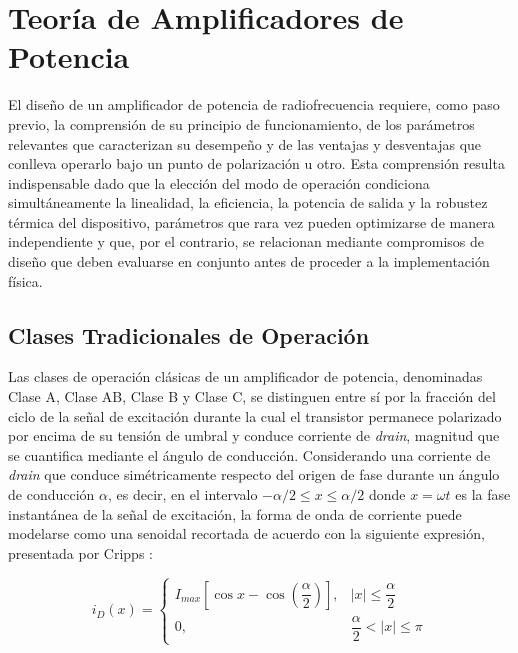 \newpage
\section{Teoría de Amplificadores de Potencia} \label{sec:teoria_pa}
El diseño de un amplificador de potencia de radiofrecuencia requiere, como paso previo, la comprensión de su principio de funcionamiento, de los parámetros relevantes que caracterizan su desempeño y de las ventajas y desventajas que conlleva operarlo bajo un punto de polarización u otro. Esta comprensión resulta indispensable dado que la elección del modo de operación condiciona simultáneamente la linealidad, la eficiencia, la potencia de salida y la robustez térmica del dispositivo, parámetros que rara vez pueden optimizarse de manera independiente y que, por el contrario, se relacionan mediante compromisos de diseño que deben evaluarse en conjunto antes de proceder a la implementación física.

\subsection{Clases Tradicionales de Operación}
Las clases de operación clásicas de un amplificador de potencia, denominadas Clase A, Clase AB, Clase B y Clase C, se distinguen entre sí por la fracción del ciclo de la señal de excitación durante la cual el transistor permanece polarizado por encima de su tensión de umbral y conduce corriente de \textit{drain}, magnitud que se cuantifica mediante el ángulo de conducción. Considerando una corriente de \textit{drain} que conduce simétricamente respecto del origen de fase durante un ángulo de conducción $\alpha$, es decir, en el intervalo $-\alpha/2 \le x \le \alpha/2$ donde $x = \omega t$ es la fase instantánea de la señal de excitación, la forma de onda de corriente puede modelarse como una senoidal recortada de acuerdo con la siguiente expresión, presentada por Cripps \cite{Cripps2006}:

\begin{equation}
    i_D(x) =
    \begin{cases}
        I_{max}\left[\cos x - \cos\left(\dfrac{\alpha}{2}\right)\right], & |x| \le \dfrac{\alpha}{2} \\[6pt]
        0, & \dfrac{\alpha}{2} < |x| \le \pi
    \end{cases}
    \label{eq:id_alpha}
\end{equation}

